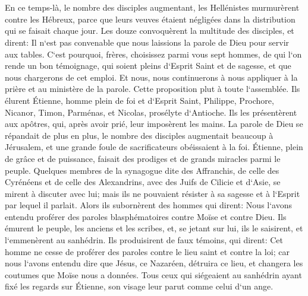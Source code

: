 \chapter{}

\verse En ce temps-là, le nombre des disciples augmentant, les Hellénistes murmurèrent contre les Hébreux, parce que leurs veuves étaient négligées dans la distribution qui se faisait chaque jour. 
\verse Les douze convoquèrent la multitude des disciples, et dirent: Il n`est pas convenable que nous laissions la parole de Dieu pour servir aux tables. 
\verse C`est pourquoi, frères, choisissez parmi vous sept hommes, de qui l`on rende un bon témoignage, qui soient pleins d`Esprit Saint et de sagesse, et que nous chargerons de cet emploi. 
\verse Et nous, nous continuerons à nous appliquer à la prière et au ministère de la parole. 
\verse Cette proposition plut à toute l`assemblée. Ils élurent Étienne, homme plein de foi et d`Esprit Saint, Philippe, Prochore, Nicanor, Timon, Parménas, et Nicolas, prosélyte d`Antioche. 
\verse Ils les présentèrent aux apôtres, qui, après avoir prié, leur imposèrent les mains. 
\verse La parole de Dieu se répandait de plus en plus, le nombre des disciples augmentait beaucoup à Jérusalem, et une grande foule de sacrificateurs obéissaient à la foi. 
\verse Étienne, plein de grâce et de puissance, faisait des prodiges et de grands miracles parmi le peuple. 
\verse Quelques membres de la synagogue dite des Affranchis, de celle des Cyrénéens et de celle des Alexandrins, avec des Juifs de Cilicie et d`Asie, se mirent à discuter avec lui; 
\verse mais ils ne pouvaient résister à sa sagesse et à l`Esprit par lequel il parlait. 
\verse Alors ils subornèrent des hommes qui dirent: Nous l`avons entendu proférer des paroles blasphématoires contre Moïse et contre Dieu. 
\verse Ils émurent le peuple, les anciens et les scribes, et, se jetant sur lui, ils le saisirent, et l`emmenèrent au sanhédrin. 
\verse Ils produisirent de faux témoins, qui dirent: Cet homme ne cesse de proférer des paroles contre le lieu saint et contre la loi; 
\verse car nous l`avons entendu dire que Jésus, ce Nazaréen, détruira ce lieu, et changera les coutumes que Moïse nous a données. 
\verse Tous ceux qui siégeaient au sanhédrin ayant fixé les regards sur Étienne, son visage leur parut comme celui d`un ange. 

\chapter{}

